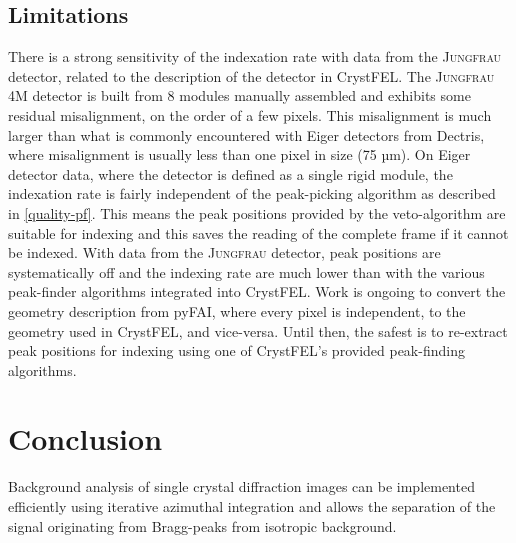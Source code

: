\documentclass[preprint]{iucr}              %
\begin{document}
\subsection{Limitations}
There is a strong sensitivity of the indexation rate with data from the \textsc{Jungfrau} detector, related to the description of the detector in CrystFEL.
The \textsc{Jungfrau} 4M detector is built from 8 modules manually assembled and exhibits some residual misalignment, on the order of a few pixels.
This misalignment is much larger than what is commonly encountered with Eiger detectors from Dectris, where misalignment is usually less than one pixel in size (75 µm).
On Eiger detector data, where the detector is defined as a single rigid module, the indexation rate is fairly independent of the peak-picking algorithm as described in \ref{quality-pf}.
This means the peak positions provided by the veto-algorithm are suitable for indexing and this saves the reading of the complete frame if it cannot be indexed.
With data from the \textsc{Jungfrau} detector, peak positions are systematically off and the indexing rate are much lower than with the various peak-finder algorithms integrated into CrystFEL.
Work is ongoing to convert the geometry description from pyFAI, where every pixel is independent, to the geometry used in CrystFEL, and vice-versa. 
Until then, the safest is to re-extract peak positions for indexing using one of CrystFEL's provided peak-finding algorithms. 

\section{Conclusion}

Background analysis of single crystal diffraction images can be implemented efficiently using iterative azimuthal integration and allows the separation of the signal originating from Bragg-peaks from isotropic background.
\end{document}
